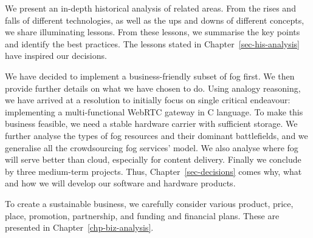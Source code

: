 We present an in-depth historical analysis of related areas. From the rises and falls of different technologies, as well as the ups and downs of different concepts, we share illuminating lessons. From these lessons, we summarise the key points and identify the best practices.   
The lessons stated in Chapter~\ref{sec-his-analysis} have inspired our decisions. 

We have decided to implement a business-friendly subset of fog first. We then provide further details on what we have chosen to do. Using analogy reasoning, we have arrived at a resolution to initially focus on single critical endeavour: implementing a multi-functional WebRTC gateway in C language. To make this business feasible, we need a stable hardware carrier with sufficient storage. We further analyse the types of fog resources and their dominant battlefields, and we generalise all the crowdsourcing fog services' model. We also analyse where fog will serve better than cloud, especially for content delivery. Finally we conclude by three medium-term projects. Thus, Chapter~\ref{sec-decisions} comes why, what and how we will develop our software and hardware products. 

To create a sustainable business, we carefully consider various product, price, place, promotion, partnership, and funding and financial plans. These are presented in Chapter~\ref{chp-biz-analysis}. 
